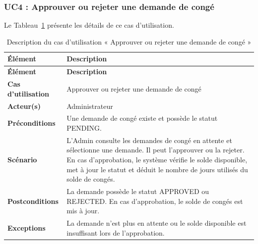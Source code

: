 
\subsubsection{UC4 : Approuver ou rejeter une demande de congé}
Le Tableau~\ref{tab:uc4-validation-conge} présente les détails de ce cas d'utilisation.

\begin{longtable}{|>{\RaggedRight\arraybackslash}p{4cm}|>{\RaggedRight\arraybackslash}p{10.5cm}|}
\caption{Description du cas d'utilisation « Approuver ou rejeter une demande de congé »}
\label{tab:uc4-validation-conge}\\
\hline

\textbf{Élément} & \textbf{Description} \\

\hline

\endfirsthead

\hline

\textbf{Élément} & \textbf{Description} \\

\hline

\endhead

\textbf{Cas d'utilisation} &
Approuver ou rejeter une demande de congé \\

\hline

\textbf{Acteur(s)} &
Administrateur \\

\hline

\textbf{Préconditions} &
Une demande de congé existe et possède le statut PENDING. \\

\hline

\textbf{Scénario} &
L'Admin consulte les demandes de congé en attente et sélectionne une demande. Il peut l'approuver ou la rejeter. En cas d'approbation, le système vérifie le solde disponible, met à jour le statut et déduit le nombre de jours utilisés du solde de congés. \\

\hline

\textbf{Postconditions} &
La demande possède le statut APPROVED ou REJECTED. En cas d'approbation, le solde de congés est mis à jour. \\

\hline

\textbf{Exceptions} &
La demande n'est plus en attente ou le solde disponible est insuffisant lors de l'approbation. \\

\hline



\end{longtable}



